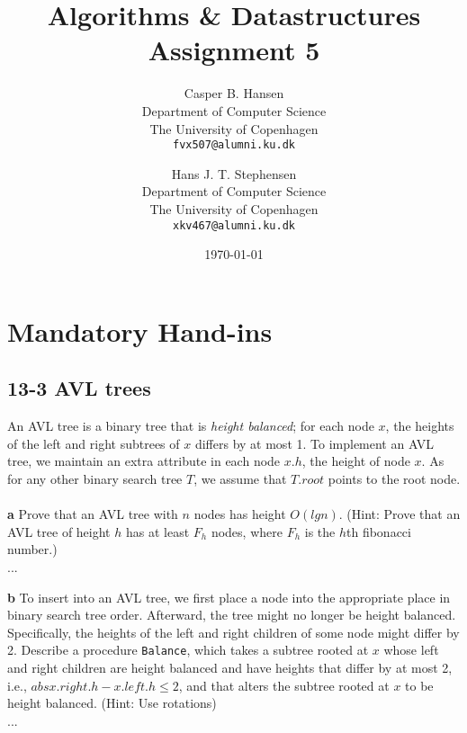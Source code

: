 \documentclass[11pt,english]{article}
\title
{
	\vspace{1in}
	Algorithms \& Datastructures\\
	\huge Assignment 5
}
\author
{
	Casper B. Hansen\\
	\small Department of Computer Science\\
	\small The University of Copenhagen\\
	\texttt{fvx507@alumni.ku.dk}
	\and
	Hans J. T. Stephensen\\
	\small Department of Computer Science\\
	\small The University of Copenhagen\\
	\texttt{xkv467@alumni.ku.dk}
}
\date{\today}
\begin{document}
\clearpage
\maketitle
\thispagestyle{empty}


\newpage
\pagestyle{fancy}

\section*{Mandatory Hand-ins}

\subsection*{13-3 AVL trees}
\large{An AVL tree is a binary tree that is \textit{height balanced}; for each
node $x$, the heights of the left and right subtrees of $x$ differs by at most
1. To implement an AVL tree, we maintain an extra attribute in each node $x.h$,
the height of node $x$. As for any other binary search tree $T$, we assume
that $T.root$ points to the root node.}
\\\\
\noindent \large{\textbf{a} \mdseries Prove that an AVL tree with $n$ nodes
has height $O(lg n)$. (Hint: Prove that an AVL tree of height $h$ has at
least $F_h$ nodes, where $F_h$ is the $h$th fibonacci number.)}
\\
...

\noindent \large{\textbf{b} \mdseries To insert into an AVL tree, we first
place a node into the appropriate place in binary search tree order.
Afterward, the tree might no longer be height balanced. Specifically, the
heights of the left and right children of some node might differ by 2.
Describe a procedure \texttt{Balance}, which takes a subtree rooted at $x$
whose left and right children are height balanced and have heights that differ
by at most 2, i.e., $abs{x.right.h - x.left.h} \leq 2$, and that alters the
subtree rooted at $x$ to be height balanced. (Hint: Use rotations)}
\\
...







\end{document}
